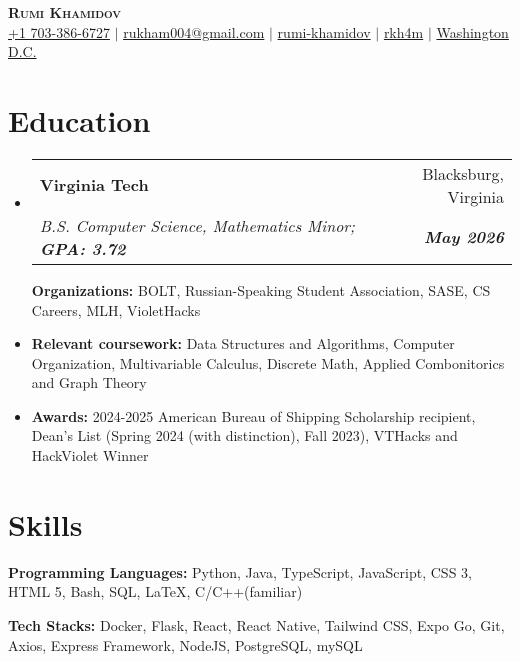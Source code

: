 \documentclass[letterpaper, 10pt]{article}
\makeatletter
\newcommand{\resumeItem}[1]{
  \item\small{
    {#1 \vspace{-2pt}}
  }
}
\newcommand{\resumeEducationHeading}[6]{
  \vspace{-2pt}\item
    \begin{tabular*}{0.97\textwidth}[t]{l@{\extracolsep{\fill}}r}
      \textbf{#1} & #2 \\
      \textit{\small#3} & \textit{\small #4} \\
    \end{tabular*}\vspace{-5pt}
}
\newcommand{\resumeSubHeadingListStart}{\begin{itemize}[leftmargin=0.15in, label={}]}
\newcommand{\resumeSubHeadingListEnd}{\end{itemize}}
\newcommand{\resumeItemListStart}{\begin{itemize}}
\newcommand{\resumeItemListEnd}{\end{itemize}\vspace{-5pt}}
\makeatother
\begin{document}

\begin{center}
    \textbf{\Huge \scshape Rumi Khamidov} \\ \vspace{3pt}
    \small
    \faMobile \hspace{.5pt} \href{tel:7033866727}{+1 703-386-6727}
    $|$
    \faAt \hspace{.5pt} \href{mailto:rukham004@gmail.com}{rukham004@gmail.com}
    $|$
    \faLinkedinSquare \hspace{.5pt} \href{https://www.linkedin.com/in/rumi-khamidov}{rumi-khamidov}
    $|$
    \faGithub \hspace{.5pt} \href{https://github.com/rkh4m}{rkh4m}
    $|$
    \faMapMarker \hspace{.5pt} \href{https://maps.app.goo.gl/aoi52DAKhQkgQ1MT8}{Washington D.C.}
\end{center}



\section{Education}
  \vspace{3pt}
  \resumeSubHeadingListStart
    
    \resumeEducationHeading
      {Virginia Tech
      }{Blacksburg, Virginia}
      {B.S. Computer Science, Mathematics Minor; \textbf{GPA: 3.72}}{\textbf{May 2026}}

        \resumeItemListStart
	   \resumeItem{\textbf{Organizations:} BOLT, Russian-Speaking Student Association, SASE, CS Careers, MLH, VioletHacks}
             \resumeItem{\textbf{Relevant coursework:}  Data Structures and Algorithms, Computer Organization, Multivariable Calculus, Discrete Math, Applied Combonitorics and Graph Theory}
	\resumeItem{\textbf{Awards:}  2024-2025 American Bureau of Shipping Scholarship recipient, Dean's List (Spring 2024 (with distinction), Fall 2023), VTHacks and HackViolet Winner}
         \resumeItemListEnd


\section{Skills}
  \vspace{2pt}
  \resumeSubHeadingListStart
    \small{\item{
        \textbf{Programming Languages:}{ Python, Java, TypeScript, JavaScript, CSS 3, HTML 5, Bash, SQL, LaTeX, C/C++(familiar) } \\ \vspace{3pt}
                
        \textbf{Tech Stacks:}{ Docker, Flask, React, React Native, Tailwind CSS, Expo Go, Git, Axios, Express Framework, NodeJS, PostgreSQL, mySQL } \\ \vspace{3pt}
    }}
  \resumeSubHeadingListEnd
\end{document}
